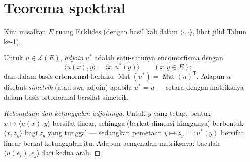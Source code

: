 \section{Teorema spektral}

Kini misalkan $E$ ruang Euklides (dengan hasil kali dalam
$\langle\cdot,\cdot\rangle$, lihat jilid Tahun ke-1).

\begin{definition}\label{def:b2:quadratic:adjoint}
Untuk $u \in \mathcal{L}(E)$, \emph{adjoin}
$u^*$ adalah satu-satunya endomorfisma dengan
\[
\langle u(x), y\rangle = \langle x, u^*(y)\rangle
\qquad (x, y \in E);
\]
dan dalam basis ortonormal berlaku $\operatorname{Mat}(u^*) =
\operatorname{Mat}(u)^{\mathsf T}$. Adapun $u$ disebut
\emph{simetrik} (atau swa-adjoin) apabila
$u^* = u$ --- setara dengan matriksnya dalam basis ortonormal bersifat
simetrik.
\end{definition}

\begin{proof}[Keberadaan dan ketunggalan adjoinnya]
Untuk $y$ yang tetap, bentuk $x \mapsto \langle u(x), y\rangle$ bersifat
linear, sehingga (berkat dimensi hingganya) berbentuk $\langle x,
z_y\rangle$ bagi $z_y$ yang tunggal --- sedangkan pemetaan $y \mapsto z_y =:
u^*(y)$ bersifat linear berkat ketunggalan itu. Adapun pengenalan matriksnya:
bacalah $\langle u(e_i), e_j\rangle$ dari kedua arah.
\end{proof}

